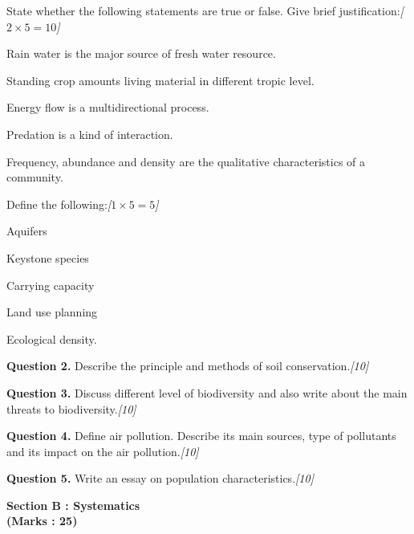 \documentclass[11pt,a4paper]{article}
\newcommand{\pts}[1]{\hfill   \textit{[#1]}}
\begin{document}
\begin{parts}
  \item State whether the following statements are true or false. Give brief justification:\pts{$2  \times 5 = 10$}
  
\begin{parts}
    \item Rain water is the major source of fresh water resource.
    \item Standing crop amounts living material in different tropic level.
    \item Energy flow is a multidirectional process.
    \item Predation is a kind of interaction.
    \item Frequency, abundance and density are the qualitative characteristics of a community.
  \end{parts}

  \item Define the following:\pts{$1  \times 5 = 5$}
  
\begin{parts}
    \item Aquifers
    \item Keystone species
    \item Carrying capacity
    \item Land use planning
    \item Ecological density.
  \end{parts}
\end{parts}

\medskip


\noindent   \textbf{Question 2.} Describe the principle and methods of soil conservation.\pts{10}

\medskip


\noindent   \textbf{Question 3.} Discuss different level of biodiversity and also write about the main threats to biodiversity.\pts{10}

\medskip


\noindent   \textbf{Question 4.} Define air pollution. Describe its main sources, type of pollutants and its impact on the air pollution.\pts{10}

\medskip


\noindent   \textbf{Question 5.} Write an essay on population characteristics.\pts{10}

\pagebreak


\begin{center}
   \textbf{Section B : Systematics} \\
   \textbf{(Marks : 25)}
\end{center}
\end{document}
